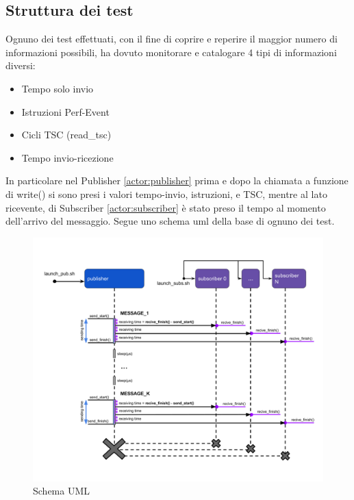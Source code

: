 \subsection{Struttura dei test}
Ognuno dei test effettuati, con il fine di coprire e reperire il maggior numero di informazioni possibili, ha dovuto monitorare e catalogare 4 tipi di informazioni diversi:

\begin{itemize}
    \item Tempo solo invio
    \item Istruzioni Perf-Event
    \item Cicli TSC (read\_tsc)
    \item Tempo invio-ricezione
\end{itemize}

In particolare nel Publisher \ref{actor:publisher} prima e dopo la chiamata a funzione di write() %
si sono presi i valori tempo-invio, istruzioni, e TSC, mentre al lato ricevente, di Subscriber \ref{actor:subscriber} è stato preso il tempo al momento dell'arrivo del messaggio. Segue uno schema uml della base di ognuno dei test.
\begin{figure}[H]
    \centering
    \includegraphics[width=\textwidth]{./img/umel-send-receive.png}
    \caption{Schema UML} %
    \label{fig:uml}
\end{figure}

